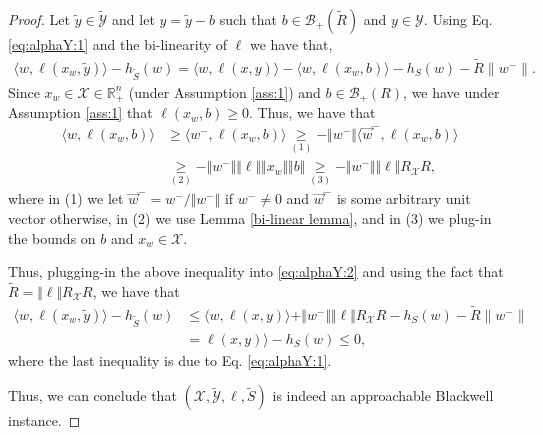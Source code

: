 \documentclass[a4paper,12pt]{article}
\newcommand{\mY}{\mathcal{Y}}
\newcommand{\mX}{\mathcal{X}}
\newcommand{\tY}{\tilde{\mathcal{Y}}}
\newcommand{\tS}{\tilde{S}}
\newcommand{\mB}{\mathcal{B}}
\newcommand{\reals}{\mathbb{R}}
\begin{document}
\begin{proof}
Let $\tilde{y}\in\tilde{\mY}$ and let $y = \tilde{y}-b$ such that $b\in\mB_+(\tilde{R})$ and $y\in\mY$. Using Eq. \eqref{eq:alphaY:1} and the bi-linearity of $\ell$ we have that,
\begin{align}\label{eq:alphaY:2}
\langle w, \ell (x_{w}, \tilde{y}) \rangle - h_{\tS}(w) = \langle w, \ell (x, y) \rangle - \langle w, \ell (x_w, b)\rangle - h_{S}(w)-\tilde{R}\|w^-\|.
\end{align}
Since $x_w\in\mX\in\reals^n_+$ (under Assumption \ref{ass:1}) and $b\in\mB_+(R)$, we have under Assumption \ref{ass:1} that $\ell(x_w,b) \geq 0$. Thus, we have that 
\begin{align*}
 \langle w, \ell (x_w, b)\rangle &\geq  \langle w^-, \ell (x_w, b)\rangle \underset{(1)}{\geq} -\Vert{w^-}\Vert{}\langle \vec{w}^-, \ell (x_w, b)\rangle \\
 &\underset{(2)}{\geq} 
 -\Vert{w^-}\Vert{}\Vert{\ell}\Vert\Vert{x_w}\Vert\Vert{b}\Vert \underset{(3)}{\geq} -\Vert{w^-}\Vert\Vert{\ell}\Vert{}R_{\mX}R,
\end{align*}
where in (1) we let $\vec{w}^- = w^-/\Vert{w^-}\Vert$ if $w^-\neq 0$ and $\vec{w}^-$ is some arbitrary unit vector otherwise, in (2) we use Lemma \ref{bi-linear lemma}, and in (3) we plug-in the bounds on $b$ and $x_w\in\mX$. 

Thus, plugging-in the above inequality into \eqref{eq:alphaY:2} and using the fact that $\tilde{R} = \Vert{\ell}\Vert{}R_{\mX}R$, we have that
\begin{align*}
\langle w, \ell (x_{w}, \tilde{y}) \rangle - h_{\tS}(w) &\leq  \langle w, \ell (x, y) \rangle + \Vert{w^-}\Vert\Vert{\ell}\Vert{}R_{\mX}R- h_{S}(w)-\tilde{R}\|w^-\| \\
&=  \ell (x, y) \rangle - h_{S}(w) \leq 0,
\end{align*}
where the last inequality is due to Eq. \eqref{eq:alphaY:1}.

Thus, we can conclude that $(\mX ,\tY ,\ell ,\tS)$ is indeed an approachable Blackwell instance.

\end{proof}
\end{document}
